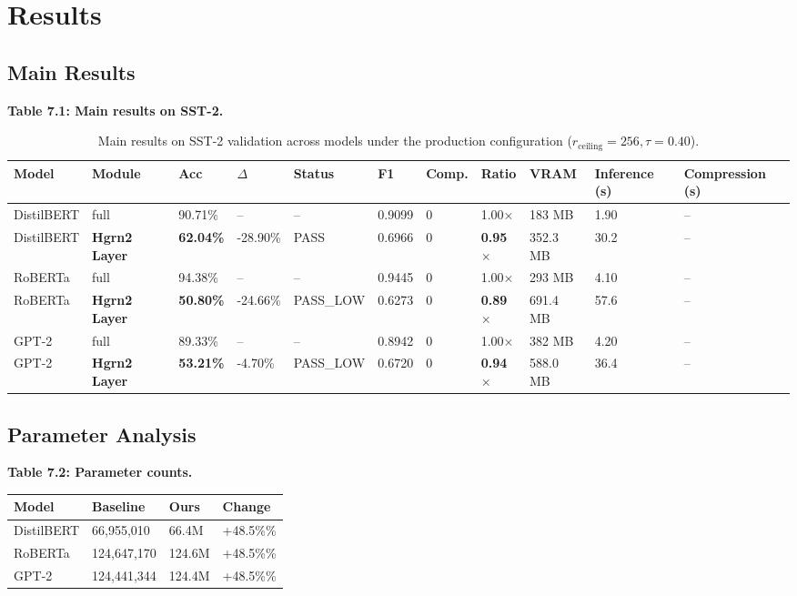 \section{Results}

\subsection{Main Results}

\textbf{Table 7.1: Main results on SST-2.}

\begin{table}[t]
\centering
\small
\begin{tabular}{lllllllllll}
\toprule
\textbf{Model} & \textbf{Module} & \textbf{Acc} & \textbf{$\Delta$} & \textbf{Status} & \textbf{F1} & \textbf{Comp.} & \textbf{Ratio} & \textbf{VRAM} & \textbf{Inference (s)} & \textbf{Compression (s)} \\
\midrule
DistilBERT & full & 90.71\% & -- & -- & 0.9099 & 0 & 1.00$\times$ & 183 MB & 1.90 & -- \\
DistilBERT & \textbf{Hgrn2 Layer} & \textbf{62.04\%} & -28.90\% & PASS & 0.6966 & 0 & \textbf{0.95$\times$} & 352.3 MB & 30.2 & -- \\
RoBERTa & full & 94.38\% & -- & -- & 0.9445 & 0 & 1.00$\times$ & 293 MB & 4.10 & -- \\
RoBERTa & \textbf{Hgrn2 Layer} & \textbf{50.80\%} & -24.66\% & PASS_LOW & 0.6273 & 0 & \textbf{0.89$\times$} & 691.4 MB & 57.6 & -- \\
GPT-2 & full & 89.33\% & -- & -- & 0.8942 & 0 & 1.00$\times$ & 382 MB & 4.20 & -- \\
GPT-2 & \textbf{Hgrn2 Layer} & \textbf{53.21\%} & -4.70\% & PASS_LOW & 0.6720 & 0 & \textbf{0.94$\times$} & 588.0 MB & 36.4 & -- \\
\bottomrule
\end{tabular}
\caption{Main results on SST-2 validation across models under the production configuration ($r_{\mathrm{ceiling}}=256, \tau=0.40$).}
\label{tab:main_sst2}
\end{table}

\subsection{Parameter Analysis}

\textbf{Table 7.2: Parameter counts.}

\begin{table}[H]
\centering
\small
\begin{tabular}{llll}
\toprule
\textbf{Model} & \textbf{Baseline} & \textbf{Ours} & \textbf{Change} \\
\midrule
DistilBERT & 66,955,010 & 66.4M & +48.5\%\% \\
RoBERTa & 124,647,170 & 124.6M & +48.5\%\% \\
GPT-2 & 124,441,344 & 124.4M & +48.5\%\% \\
\bottomrule
\end{tabular}
\end{table}

